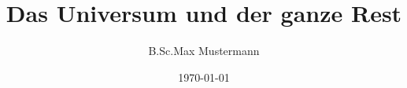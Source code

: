 \documentclass[a4paper,twoside,11pt]{book}
\title{Das Universum und der ganze Rest}
\author{B.Sc.Max Mustermann}
\date{\today}
\renewcommand{\headrulewidth}{0pt}
\begin{document}
\frontmatter

\fancyfoot[C]{\thepage}

\tableofcontents

\makeatletter
\@openrightfalse
\makeatother

\listoffigures

\listoftables

\renewcommand*{\lstlistlistingname}{Codeverzeichniss}
\lstlistoflistings

\printnoidxglossaries


\mainmatter
\renewcommand{\headrulewidth}{0.4pt}

\makeatletter
\@openrighttrue
\makeatother








\appendix






\end{document}
